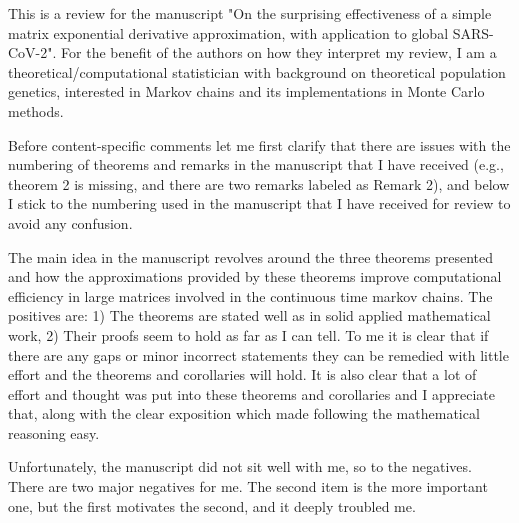 \documentclass[12pt]{article}
\begin{document}
This is a review for the manuscript "On the surprising effectiveness of a simple matrix exponential derivative approximation, with application to global SARS-CoV-2". 
For the benefit of the authors on how they interpret my review, I am a theoretical/computational statistician with background on theoretical population genetics, interested in Markov chains and its implementations in Monte Carlo methods. 

Before content-specific comments let me first clarify that there are issues with the numbering of theorems and remarks in the manuscript that I have received (e.g., theorem 2 is missing, and there are two remarks labeled as Remark 2), and below I stick to the numbering used in the manuscript that I have received for review to avoid any confusion. 

The main idea in the manuscript revolves around the three theorems presented and how the approximations provided by these theorems improve computational efficiency in large matrices involved in the continuous time markov chains. The positives are: 1) The theorems are stated well as in solid applied mathematical work, 2) Their proofs seem to hold as far as I can tell. 
To me it is clear that if there are any gaps or minor incorrect statements they can be remedied with little effort and the theorems and corollaries will hold. It is also clear that a lot of effort and thought was put into these theorems and corollaries and I appreciate that, along with the clear exposition which made following the mathematical reasoning easy. 

Unfortunately, the manuscript did not sit well with me, so to the negatives. There are two major negatives for me. The second item is the more important one, but the first motivates the second, and it deeply troubled me. 
\end{document}
